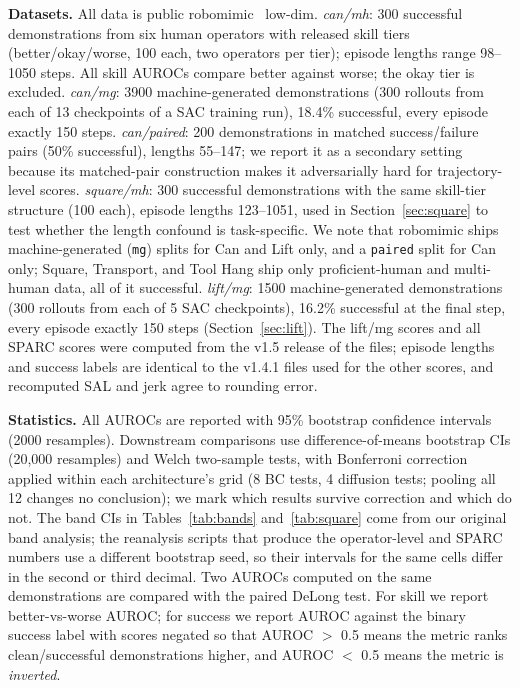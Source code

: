 \documentclass[10pt]{article}
\begin{document}
\textbf{Datasets.} All data is public robomimic~\citep{robomimic} low-dim.
\emph{can/mh}: 300 successful demonstrations from six human operators
with released skill tiers (better/okay/worse, 100 each, two operators per tier); episode lengths
range 98--1050 steps. All skill AUROCs compare better against worse; the
okay tier is excluded. \emph{can/mg}: 3900 machine-generated demonstrations
(300 rollouts from each of 13 checkpoints of a SAC training run), 18.4\%
successful, every episode exactly 150 steps. \emph{can/paired}: 200
demonstrations in matched success/failure pairs (50\% successful), lengths
55--147; we report it as a secondary setting because its matched-pair
construction makes it adversarially hard for trajectory-level scores.
\emph{square/mh}: 300 successful demonstrations with the same skill-tier
structure (100 each), episode lengths 123--1051, used in
Section~\ref{sec:square} to test whether the length confound is
task-specific. We note that robomimic ships machine-generated (\texttt{mg}) splits for Can
and Lift only, and a \texttt{paired} split for Can only; Square, Transport,
and Tool Hang ship only proficient-human and multi-human data, all of it
successful. \emph{lift/mg}: 1500 machine-generated demonstrations (300 rollouts from
each of 5 SAC checkpoints), 16.2\% successful at the final step, every
episode exactly 150 steps (Section~\ref{sec:lift}). The lift/mg scores and
all SPARC scores were computed from the v1.5 release of the files; episode
lengths and success labels are identical to the v1.4.1 files used for the
other scores, and recomputed SAL and jerk agree to rounding error.

\textbf{Statistics.} All AUROCs are reported with 95\% bootstrap confidence
intervals (2000 resamples). Downstream comparisons use difference-of-means
bootstrap CIs (20{,}000 resamples) and Welch two-sample tests, with
Bonferroni correction applied within each architecture's grid (8 BC tests,
4 diffusion tests; pooling all 12 changes no conclusion); we mark which
results survive correction and which do not. The band CIs in
Tables~\ref{tab:bands} and~\ref{tab:square} come from our original band
analysis; the reanalysis scripts that produce the operator-level and
SPARC numbers use a different bootstrap seed, so their intervals for the
same cells differ in the second or third decimal. Two AUROCs
computed on the same demonstrations are compared with the paired DeLong
test. For skill we report better-vs-worse AUROC; for
success we report AUROC against the binary success label with scores negated
so that AUROC $>$ 0.5 means the metric ranks clean/successful demonstrations
higher, and AUROC $<$ 0.5 means the metric is \emph{inverted}.
\end{document}
